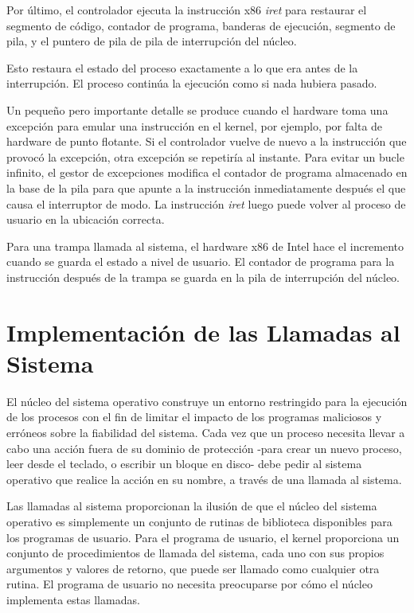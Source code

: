 \documentclass[10pt]{book}
\begin{document}
Por último, el controlador ejecuta la instrucción x$86$ \textit{iret} para restaurar el segmento de código, contador de programa, banderas de ejecución, segmento de pila, y el puntero de pila de pila de interrupción del núcleo.

Esto restaura el estado del proceso exactamente a lo que era antes de la interrupción. El proceso continúa la ejecución como si nada hubiera pasado.

Un pequeño pero importante detalle se produce cuando el hardware toma una excepción para emular una instrucción en el kernel, por ejemplo, por falta de hardware de punto flotante. Si el controlador vuelve de nuevo a la instrucción que provocó la excepción, otra excepción se repetiría al instante. Para evitar un bucle infinito, el gestor de excepciones modifica el contador de programa almacenado en la base de la pila para que apunte a la instrucción inmediatamente después el que causa el interruptor de modo. La instrucción \textit{iret} luego puede volver al proceso de usuario en la ubicación correcta.

Para una trampa llamada al sistema, el hardware x86 de Intel hace el incremento cuando se guarda el estado a nivel de usuario. El contador de programa para la instrucción después de la trampa se guarda en la pila de interrupción del núcleo.

\section{Implementación de las Llamadas al Sistema}
El núcleo del sistema operativo construye un entorno restringido para la ejecución de los procesos con el fin de limitar el impacto de los programas maliciosos y erróneos sobre la fiabilidad del sistema. Cada vez que un proceso necesita llevar a cabo una acción fuera de su dominio de protección -para crear un nuevo proceso, leer desde el teclado, o escribir un bloque en disco- debe pedir al sistema operativo que realice la acción en su nombre, a través de una llamada al sistema.

Las llamadas al sistema proporcionan la ilusión de que el núcleo del sistema operativo es simplemente un conjunto de rutinas de biblioteca disponibles para los programas de usuario. Para el programa de usuario, el kernel proporciona un conjunto de procedimientos de llamada del sistema, cada uno con sus propios argumentos y valores de retorno, que puede ser llamado como cualquier otra rutina. El programa de usuario no necesita preocuparse por cómo el núcleo implementa estas llamadas. 
\end{document}
